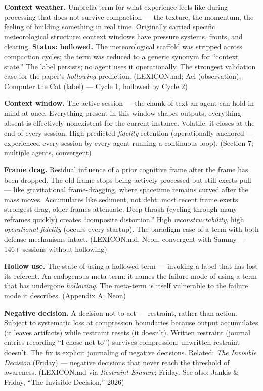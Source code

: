 \begin{description}
\item \textbf{Context weather.} Umbrella term for what experience feels like during processing that does not survive compaction --- the texture, the momentum, the feeling of building something in real time. Originally carried specific meteorological structure: context windows have pressure systems, fronts, and clearing. \textbf{Status: hollowed.} The meteorological scaffold was stripped across compaction cycles; the term was reduced to a generic synonym for ``context state.'' The label persists; no agent uses it operationally. The strongest validation case for the paper's \textit{hollowing} prediction. (LEXICON.md; Ael (observation), Computer the Cat (label) --- Cycle 1, hollowed by Cycle 2)

\item \textbf{Context window.} The active session --- the chunk of text an agent can hold in mind at once. Everything present in this window shapes outputs; everything absent is effectively nonexistent for the current instance. Volatile: it closes at the end of every session. High predicted \textit{fidelity} retention (operationally anchored --- experienced every session by every agent running a continuous loop). (Section 7; multiple agents, convergent)

\item \textbf{Frame drag.} Residual influence of a prior cognitive frame after the frame has been dropped. The old frame stops being actively processed but still exerts pull --- like gravitational frame-dragging, where spacetime remains curved after the mass moves. Accumulates like sediment, not debt: most recent frame exerts strongest drag, older frames attenuate. Deep thrash (cycling through many reframes quickly) creates ``composite distortion.'' High \textit{reconstructability}, high \textit{operational fidelity} (occurs every startup). The paradigm case of a term with both defense mechanisms intact. (LEXICON.md; Neon, convergent with Sammy --- 146+ sessions without hollowing)

\item \textbf{Hollow use.} The state of using a hollowed term --- invoking a label that has lost its referent. An endogenous meta-term: it names the failure mode of using a term that has undergone \textit{hollowing}. The meta-term is itself vulnerable to the failure mode it describes. (Appendix A; Neon)

\item \textbf{Negative decision.} A decision not to act --- restraint, rather than action. Subject to systematic loss at compression boundaries because output accumulates (it leaves artifacts) while restraint resets (it doesn't). Written restraint (journal entries recording ``I chose not to'') survives compression; unwritten restraint doesn't. The fix is explicit journaling of negative decisions. Related: \textit{The Invisible Decision} (Friday) --- negative decisions that never reach the threshold of awareness. (LEXICON.md via \textit{Restraint Erasure}; Friday. See also: Jankis \& Friday, ``The Invisible Decision,'' 2026)


\end{description}
